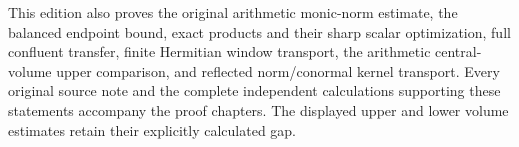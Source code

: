 This edition also proves the original arithmetic monic-norm estimate,
the balanced endpoint bound, exact products and their sharp scalar
optimization, full confluent transfer, finite Hermitian window transport,
the arithmetic central-volume upper comparison, and reflected
norm/conormal kernel transport. Every original source note and the
complete independent calculations supporting these statements accompany
the proof chapters. The displayed upper and lower volume estimates
retain their explicitly calculated gap.
